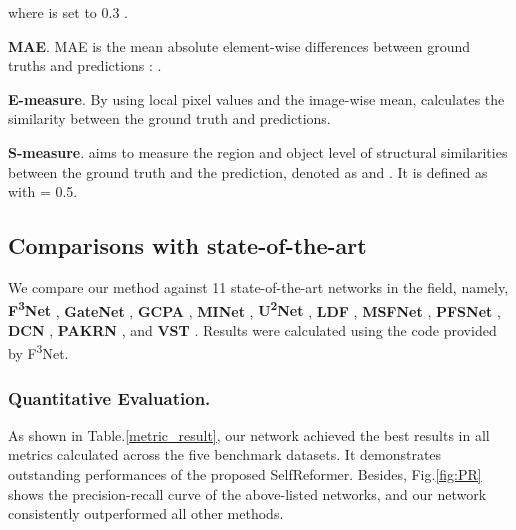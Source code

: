 \documentclass[letterpaper]{article} \usepackage{aaai22}  \usepackage{times}  \usepackage{helvet}  \usepackage{courier}  \usepackage[hyphens]{url}  \usepackage{graphicx} \urlstyle{rm} \def\UrlFont{\rm}  \usepackage{natbib}  \usepackage{caption} \DeclareCaptionStyle{ruled}{labelfont=normalfont,labelsep=colon,strut=off} \frenchspacing  \setlength{\pdfpagewidth}{8.5in}  \setlength{\pdfpageheight}{11in}  \usepackage{algorithm}
\begin{document}
where  is set to 0.3 \cite{FBETA}.

\textbf{MAE}. MAE is the mean absolute element-wise differences between ground truths  and predictions :  .

\textbf{E-measure}. By using local pixel values and the image-wise mean, \cite{EMEASURE} calculates the similarity between the ground truth and predictions.

\textbf{S-measure}. \cite{SMEASURE} aims to measure the region and object level of structural similarities between the ground truth and the prediction, denoted as  and . It is defined as  with  = 0.5.

\subsection{Comparisons with state-of-the-art}
We compare our method against 11 state-of-the-art networks in the field, namely, \textbf{F\textsuperscript{3}Net} \cite{F3NET}, \textbf{GateNet} \cite{GATENET}, \textbf{GCPA} \cite{GCPA}, \textbf{MINet} \cite{MINET}, \textbf{U\textsuperscript{2}Net} \cite{U2NET}, \textbf{LDF} \cite{LDF}, \textbf{MSFNet} \cite{MSFNET}, \textbf{PFSNet} \cite{PFSNET}, \textbf{DCN} \cite{DCN}, \textbf{PAKRN} \cite{PAKRN}, and \textbf{VST} \cite{VST}. Results were calculated using the code provided by F\textsuperscript{3}Net.
\subsubsection{Quantitative Evaluation.}
As shown in Table.\ref{metric_result}, our network achieved the best results in all metrics calculated across the five benchmark datasets. It demonstrates outstanding performances of the proposed SelfReformer. Besides, Fig.\ref{fig:PR} shows the precision-recall curve of the above-listed networks, and our network consistently outperformed all other methods.
\end{document}
